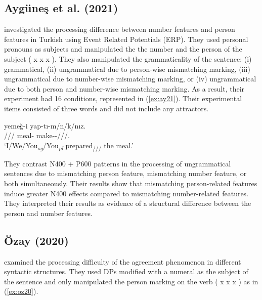 \subsection{Ayg\"une\c{s} et al. (2021)}


 investigated the processing difference between number features and person features in Turkish using Event Related Potentials (ERP). They used personal pronouns as subjects and manipulated the the number and the person of the subject (\Fsg{} x \Fpl{} x \Ssg{} x \Spl{}). They also manipulated the grammaticality of the sentence: (i) grammatical, (ii) ungrammatical due to person-wise mismatching marking, (iii) ungrammatical due to number-wise mismatching marking, or (iv) ungrammatical due to both person and number-wise mismatching marking. As a result, their experiment had 16 conditions, represented in (\ref{ex:ay21}). Their experimental items consisted of three words and did not include any attractors.

\ea \label{ex:ay21}
     yeme\u{g}-i yap-t{\i}-{m/n/k/n{\i}z}.\\
    {\Fsg/\Fpl/\Ssg/\Spl} meal-\Acc{} make-\Pst-{\Fsg/\Fpl/\Ssg/\Spl}.\\
    \glt `{I/We/You\textsubscript{\it sg}/You\textsubscript{\it pl}} prepared\textsubscript{\Fsg/\Fpl/\Ssg/\Spl} the meal.'
\z

They contrast N400 + P600 patterns in the processing of ungrammatical sentences due to mismatching person feature, mismatching number feature, or both simultaneously. Their results show that mismatching person-related features induce greater N400 effects compared to mismatching number-related features. They interpreted their results as evidence of a structural difference between the person and number features. 

\subsection{\"Ozay (2020)}

 examined the processing difficulty of the agreement phenomenon in different syntactic structures. They used DPs modified with a numeral as the subject of the sentence and only manipulated the person marking on the verb (\Tsg{} x \Tpl{} x \Spl{} x \Fpl) as in (\ref{ex:oz20}). 


